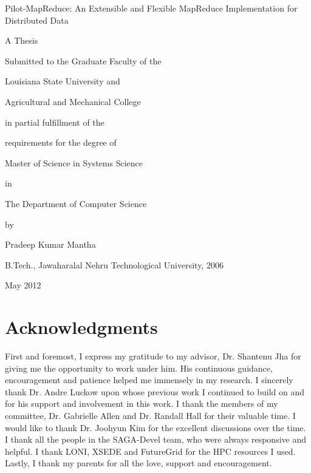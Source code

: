 \documentclass[12pt]{report}
\begin{document}
 \thispagestyle{empty} \vspace*{1.5cm}

\centerline{Pilot-MapReduce: An Extensible and Flexible MapReduce Implementation for Distributed Data}
\vspace{4.5cm}
\centerline{A Thesis} 
\vspace{.3cm} 
\centerline{Submitted to the Graduate Faculty of the} 
\centerline{Louisiana State University and} 
\centerline{Agricultural and Mechanical College}
\centerline{in partial fulfillment of the}
\centerline{requirements for the degree of} 
\centerline{Master of Science in Systems Science} 
\vspace{.3cm} 
\centerline{in} 
\vspace{.3cm}
\centerline{The Department of Computer Science} 
\vspace{5cm}
\centerline{by} \centerline{Pradeep Kumar Mantha} 
\centerline{B.Tech., Jawaharalal Nehru Technological University, 2006}
\centerline{May 2012}

\renewcommand{\cftchapdotsep}{\cftdotsep}

\chapter*{Acknowledgments}


\doublesize  %
First and foremost, I express my gratitude to my advisor, Dr. Shantenu Jha for giving me the opportunity to work under him. His continuous guidance, encouragement and patience helped me immensely in my research. I sincerely thank Dr. Andre Luckow upon whose previous work I continued to build on and for his support and involvement in this work. I thank the members of my committee, Dr. Gabrielle Allen and Dr. Randall Hall for their valuable time. I would like to thank Dr. Joohyun Kim for the excellent discussions over the time. I thank all the people in the SAGA-Devel team, who were always responsive and helpful. I thank LONI, XSEDE and FutureGrid for the HPC resources I used. Lastly, I thank my parents for all the love, support and encouragement.
\normalsize


\newpage

\renewcommand{\contentsname}{Table of Contents}
\setlength{\cftbeforetoctitleskip}{0 in}
\end{document}
